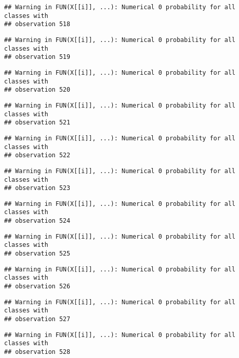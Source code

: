 \documentclass[
]{article}
\begin{document}
\begin{verbatim}
## Warning in FUN(X[[i]], ...): Numerical 0 probability for all classes with
## observation 518
\end{verbatim}

\begin{verbatim}
## Warning in FUN(X[[i]], ...): Numerical 0 probability for all classes with
## observation 519
\end{verbatim}

\begin{verbatim}
## Warning in FUN(X[[i]], ...): Numerical 0 probability for all classes with
## observation 520
\end{verbatim}

\begin{verbatim}
## Warning in FUN(X[[i]], ...): Numerical 0 probability for all classes with
## observation 521
\end{verbatim}

\begin{verbatim}
## Warning in FUN(X[[i]], ...): Numerical 0 probability for all classes with
## observation 522
\end{verbatim}

\begin{verbatim}
## Warning in FUN(X[[i]], ...): Numerical 0 probability for all classes with
## observation 523
\end{verbatim}

\begin{verbatim}
## Warning in FUN(X[[i]], ...): Numerical 0 probability for all classes with
## observation 524
\end{verbatim}

\begin{verbatim}
## Warning in FUN(X[[i]], ...): Numerical 0 probability for all classes with
## observation 525
\end{verbatim}

\begin{verbatim}
## Warning in FUN(X[[i]], ...): Numerical 0 probability for all classes with
## observation 526
\end{verbatim}

\begin{verbatim}
## Warning in FUN(X[[i]], ...): Numerical 0 probability for all classes with
## observation 527
\end{verbatim}

\begin{verbatim}
## Warning in FUN(X[[i]], ...): Numerical 0 probability for all classes with
## observation 528
\end{verbatim}
\end{document}
